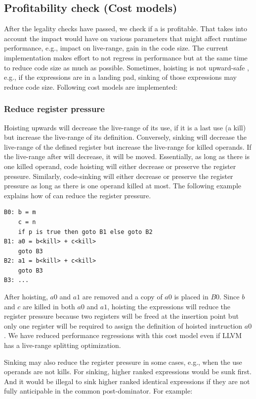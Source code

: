 \documentclass[sigplan,10pt,review,anonymous]{acmart}\settopmatter{printfolios=true,printccs=false,printacmref=false}
\begin{document}
\subsection{Profitability check (Cost models)}
\label{subsec:cost-models}
After the legality checks have passed, we check if a \GCM{} is profitable.  That
takes into account the impact \GCM{} would have on various parameters that might
affect runtime performance, e.g., impact on live-range, gain in the code
size. The current implementation makes effort to not regress in performance but
at the same time to reduce code size as much as possible. Sometimes, hoisting is
not upward-safe \cite{click1995global}, e.g., if the expressions are in a
landing pad, sinking of those expressions may reduce code size. Following cost
models are implemented:

\subsubsection{Reduce register pressure}
\label{hoist:reg-pressure}
Hoisting upwards will decrease the live-range of its use, if it is a last use (a
kill) but increase the live-range of its definition. Conversely, sinking will
decrease the live-range of the defined register but increase the live-range for
killed operands. If the live-range after \GCM{} will decrease, it will be
moved. Essentially, as long as there is one killed operand, code hoisting will
either decrease or preserve the register pressure.  Similarly, code-sinking will
either decrease or preserve the register pressure as long as there is one
operand killed at most.  The following example explains how \GCM{} of can reduce
the register pressure.

\begin{lstlisting}
B0: b = m
    c = n
    if p is true then goto B1 else goto B2
B1: a0 = b<kill> + c<kill>
    goto B3
B2: a1 = b<kill> + c<kill>
    goto B3
B3: ...
\end{lstlisting}

After hoisting, $a0$ and $a1$ are removed and a copy of $a0$ is placed in
$B0$. Since $b$ and $c$ are killed in both $a0$ and $a1$, hoisting the
expressions will reduce the register pressure because two registers will be
freed at the insertion point but only one register will be required to assign
the definition of hoisted instruction $a0$. We have reduced performance
regressions with this cost model even if LLVM has a live-range splitting
\cite{cooper1998live} optimization.

Sinking may also reduce the register pressure in some cases, e.g., when the use
operands are not kills. For sinking, higher ranked expressions would be sunk
first. And it would be illegal to sink higher ranked identical expressions if
they are not fully anticipable in the common post-dominator. For example:
\end{document}
